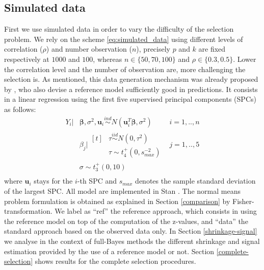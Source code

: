 \documentclass[american,]{article}
\theoremstyle{definition}
\begin{document}
\hypertarget{simulated-data}{%
\subsection{Simulated data}\label{simulated-data}}

First we use simulated data in order to vary the difficulty of the selection problem. We rely on the scheme \eqref{eq:simulated_data} using different levels of correlation ($\rho$) and number observation ($n$), precisely $p$ and $k$ are fixed respectively at $1000$ and $100$, whereas $n\in\{50,70,100\}$ and $\rho\in\{0.3,0.5\}$. Lower the correlation level and the number of observation are, more challenging the selection is. As mentioned, this data generation mechanism was already proposed by \cite{paper:projpred}, who also devise a reference model sufficiently good in predictions. It consists in a linear regression using the first five supervised principal components (SPCs) \citep{paper:original_spc, paper:piironen_spc} as follows:
\
\begin{equation}
\label{eq:ref_mod}
\begin{aligned}
    Y_{i}|&\boldsymbol{\beta},\sigma^{2},\boldsymbol{u}_{i} \overset{ind}{\sim} N(\boldsymbol{u}_{i}^{T}\boldsymbol{\beta},\sigma^{2}) \quad &i=1,..,n \\
    &\beta_{j}|\!\begin{aligned}[t] &\tau \overset{iid}{\sim} N(0,\tau^{2})\\
    &\tau \sim t_{4}^{+}(0,s_{max}^{-2}) 
    \end{aligned} &j=1,..,5 \\ 
    &\sigma \sim t_{3}^{+}(0,10) \\
\end{aligned}
\end{equation}
where $\boldsymbol{u}_{i}$ stays for the $i$-th SPC and $s_{max}$ denotes the sample standard deviation of the largest SPC. All model are implemented in Stan \citep{paper:stan}. The normal means problem formulation is obtained as explained in Section \ref{comparison} by Fisher-transformation. We label as ``ref'' the reference approach, which consists in using the reference model on top of the computation of the z-values, and ``data'' the standard approach based on the observed data only. In Section \ref{shrinkage-signal} we analyse in the context of full-Bayes methods the different shrinkage and signal estimation provided by the use of a reference model or not. Section \ref{complete-selection} shows results for the complete selection procedures.
\end{document}
